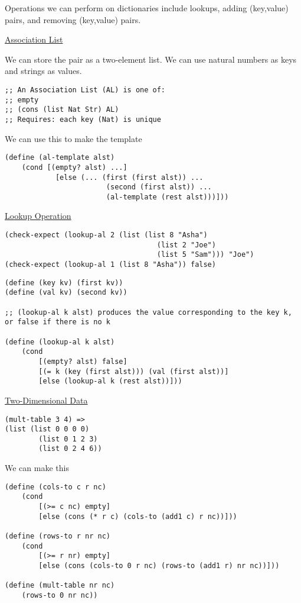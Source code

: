 \documentclass{article}
\begin{document}
Operations we can perform on dictionaries include lookups, adding (key,value) pairs, and removing (key,value) pairs. 


\underline{Association List}

We can store the pair as a two-element list. We can use natural numbers as keys and strings as values. 

\begin{lstlisting}
;; An Association List (AL) is one of:
;; empty
;; (cons (list Nat Str) AL)
;; Requires: each key (Nat) is unique
\end{lstlisting}

We can use this to make the template

\begin{lstlisting}
(define (al-template alst)
    (cond [(empty? alst) ...]
            [else (... (first (first alst)) ...
                        (second (first alst)) ...
                        (al-template (rest alst)))]))
\end{lstlisting}

\underline{Lookup Operation}

\begin{lstlisting}
(check-expect (lookup-al 2 (list (list 8 "Asha")
                                    (list 2 "Joe")
                                    (list 5 "Sam"))) "Joe")
(check-expect (lookup-al 1 (list 8 "Asha")) false)
\end{lstlisting}

\begin{lstlisting}
(define (key kv) (first kv))
(define (val kv) (second kv))

;; (lookup-al k alst) produces the value corresponding to the key k, or false if there is no k

(define (lookup-al k alst)
    (cond 
        [(empty? alst) false]
        [(= k (key (first alst))) (val (first alst))]
        [else (lookup-al k (rest alst))]))
\end{lstlisting}

\underline{Two-Dimensional Data}

\begin{lstlisting}
(mult-table 3 4) =>
(list (list 0 0 0 0)
        (list 0 1 2 3)
        (list 0 2 4 6))
\end{lstlisting}

We can make this

\begin{lstlisting}
(define (cols-to c r nc)
    (cond
        [(>= c nc) empty]
        [else (cons (* r c) (cols-to (add1 c) r nc))]))

(define (rows-to r nr nc)
    (cond
        [(>= r nr) empty]
        [else (cons (cols-to 0 r nc) (rows-to (add1 r) nr nc))]))

(define (mult-table nr nc)
    (rows-to 0 nr nc))
\end{lstlisting}
\end{document}

